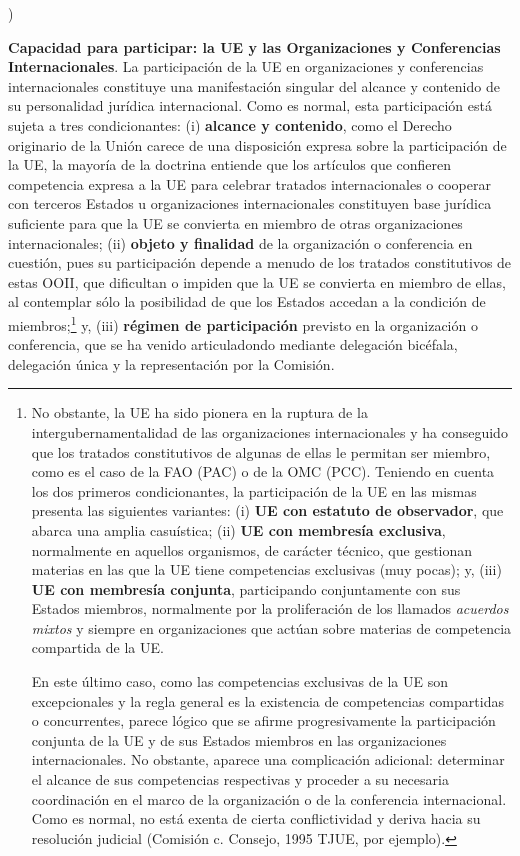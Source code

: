 \documentclass[10pt,a4paper]{article}
\newcounter{alphaitem}
\newenvironment{la}
      {\begin{list}{\alph{alphaitem})}{%
          \usecounter{alphaitem}%
          \setlength{\leftmargin}{1cm}%
          \setlength{\parskip}{3pt}%
          \setlength{\itemsep}{0pt}%
          \setlength{\parsep}{0pt}%
      }}
      {\end{list}}
\begin{document}
\begin{la}
{    }
    \item \textbf{Capacidad para participar: la UE y las Organizaciones y Conferencias Internacionales}. La participación de la UE en organizaciones y conferencias internacionales constituye una manifestación singular del alcance y contenido de su personalidad jurídica internacional. Como es normal, esta participación está sujeta a tres condicionantes: (i) \textbf{alcance y contenido}, como el Derecho originario de la Unión carece de una disposición expresa sobre la participación de la UE, la mayoría de la doctrina entiende que los artículos que confieren competencia expresa a la UE para celebrar tratados internacionales o cooperar con terceros Estados u organizaciones internacionales constituyen base jurídica suficiente para que la UE se convierta en miembro de otras organizaciones internacionales; (ii) \textbf{objeto y finalidad} de la organización o conferencia en cuestión, pues su participación depende a menudo de los tratados constitutivos de estas OOII, que dificultan o impiden que la UE se convierta en miembro de ellas, al contemplar sólo la posibilidad de que los Estados accedan a la condición de miembros;\footnote{%
        No obstante, la UE ha sido pionera en la ruptura de la intergubernamentalidad de las organizaciones internacionales y ha conseguido que los tratados constitutivos de algunas de ellas le permitan ser miembro, como es el caso de la FAO (PAC) o de la OMC (PCC). Teniendo en cuenta los dos primeros condicionantes, la participación de la UE en las mismas presenta las siguientes variantes: (i) \textbf{UE con estatuto de observador}, que abarca una amplia casuística; (ii) \textbf{UE con membresía exclusiva}, normalmente en aquellos organismos, de carácter técnico, que gestionan materias en las que la UE tiene competencias exclusivas (muy pocas); y, (iii) \textbf{UE con membresía conjunta}, participando conjuntamente con sus Estados miembros, normalmente por la proliferación de los llamados \textit{acuerdos mixtos} y siempre en organizaciones que actúan sobre materias de competencia compartida de la UE.
    
    En este último caso, como las competencias exclusivas de la UE son excepcionales y la regla general es la existencia de competencias compartidas o concurrentes, parece lógico que se afirme progresivamente la participación conjunta de la UE y de sus Estados miembros en las organizaciones internacionales. No obstante, aparece una complicación adicional: determinar el alcance de sus competencias respectivas y proceder a su necesaria coordinación en el marco de la organización o de la conferencia internacional. Como es normal, no está exenta de cierta conflictividad y deriva hacia su resolución judicial (Comisión c. Consejo, 1995 TJUE, por ejemplo).
    } y, (iii) \textbf{régimen de participación} previsto en la organización o conferencia, que se ha venido articuladondo mediante delegación bicéfala, delegación única y la representación por la Comisión.
\end{la}
\end{document}
